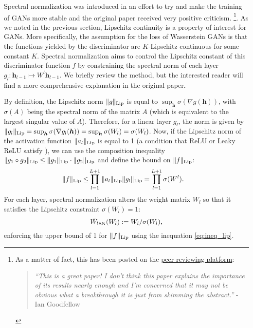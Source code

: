 Spectral normalization \cite{miyato2018spectral} was introduced in an effort to try and make the training of GANs more stable and the original paper received very positive criticism. \footnote{As a matter of fact, this has been posted on the \href{https://openreview.net/forum?id=B1QRgziT-}{peer-reviewing platform}:
\begin{quote}
\textit{``This is a great paper! I don't think this paper explains the importance of its results nearly enough and I'm concerned that it may not be obvious what a breakthrough it is just from skimming the abstract.''} - Ian Goodfellow
\end{quote}
}. As we noted in the previous section, Lipschitz continuity is a property of interest for GANs. More specifically, the assumption for the loss of Wasserstein GANs is that the functions yielded by the discriminator are $K$-Lipschitz continuous for some constant $K$. Spectral normalization aims to control the Lipschitz constant of this discriminator function $f$ by constraining the spectral norm of each layer 
$
g_l : \bm{h}_{l-1} \mapsto W^{l} \bm{h}_{l-1}
$. We briefly review the method, but the interested reader will find a more comprehensive explanation in the original paper. 

By definition, the Lipschitz norm $\|g\|_{\rm Lip}$ is equal to $\sup_{\bm{h}} \sigma (\nabla g(\bm{h}))$, with $\sigma (A)$ being the spectral norm of the matrix $A$ (which is equivalent to the largest singular value of $A$). Therefore, for a linear layer $g_l$, the norm is given by $\|g_l\|_{\rm Lip} = \sup_{\bm{h}} \sigma (\nabla g_l(\bm{h})) = \sup_{\bm{h}} \sigma (W_l) = \sigma (W_l) $. Now, if the Lipschitz norm of the activation function $\|a_l\|_{\rm Lip}$ is equal to 1 (a condition that ReLU or Leaky ReLU satisfy ), we can use the composition inequality $\|g_1\circ g_2\|_{\rm Lip}\leq\|g_1\|_{\rm Lip}\cdot\|g_2\|_{\rm Lip}$ and define the bound on $\|f\|_{\rm Lip}$:
%
%
\begin{align}
 	\|f\|_{\rm Lip} \leq &  \prod_{l=1}^{L+1} \|a_{l}\|_{\rm Lip} \|g_{l}\|_{\rm Lip} = \prod_{l=1}^{L+1} \sigma (W^{l}). \label{eq:ineq_lip}
\end{align}
For each layer, spectral normalization alters the weight matrix $W_l$ so that it satisfies the Lipschitz constraint $\sigma (W_l) = 1$:
\begin{align}
\bar{W_l}_{\rm SN}(W_l) := W_l / \sigma (W_l) \label{eq:sn},
\end{align}
enforcing the upper bound of 1 for $\|f\|_{\rm Lip}$ using the inequation \ref{eq:ineq_lip}.
